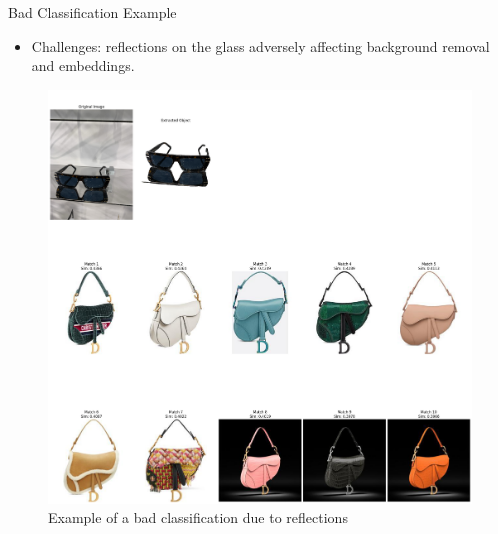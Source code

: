 \documentclass{beamer}
\begin{document}
\begin{frame}{Bad Classification Example}
\begin{itemize}
    \item Challenges: reflections on the glass adversely affecting background removal and embeddings.
\end{itemize}
\begin{figure}
    \includegraphics[width=\textwidth]{assets/bad_classification.png}
    \caption{Example of a bad classification due to reflections}
\end{figure}
\end{frame}
\end{document}

